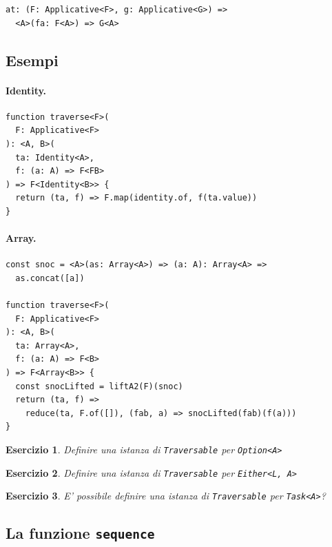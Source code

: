 \documentclass[12pt]{article}
\newtheorem{exercise}{Esercizio}[section]
\begin{document}
\begin{verbatim}
at: (F: Applicative<F>, g: Applicative<G>) =>
  <A>(fa: F<A>) => G<A>
\end{verbatim}

\subsection{Esempi}

\paragraph{Identity. }

\begin{verbatim}
function traverse<F>(
  F: Applicative<F>
): <A, B>(
  ta: Identity<A>,
  f: (a: A) => F<FB>
) => F<Identity<B>> {
  return (ta, f) => F.map(identity.of, f(ta.value))
}
\end{verbatim}

\paragraph{Array. }

\begin{verbatim}
const snoc = <A>(as: Array<A>) => (a: A): Array<A> =>
  as.concat([a])

function traverse<F>(
  F: Applicative<F>
): <A, B>(
  ta: Array<A>,
  f: (a: A) => F<B>
) => F<Array<B>> {
  const snocLifted = liftA2(F)(snoc)
  return (ta, f) =>
    reduce(ta, F.of([]), (fab, a) => snocLifted(fab)(f(a)))
}
\end{verbatim}

\begin{exercise}
Definire una istanza di \texttt{Traversable} per \texttt{Option<A>}
\end{exercise}

\begin{exercise}
Definire una istanza di \texttt{Traversable} per \texttt{Either<L, A>}
\end{exercise}

\begin{exercise}
E' possibile definire una istanza di \texttt{Traversable} per \texttt{Task<A>}?
\end{exercise}

\subsection{La funzione \texttt{sequence}}
\end{document}
